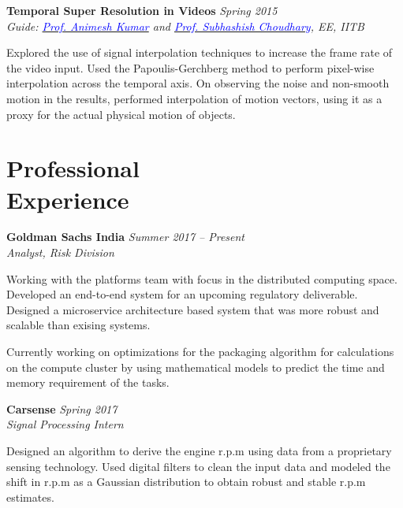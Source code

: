 \documentclass[margin,line,hidelinks]{res}
\newenvironment{list1}{
  \begin{list}{\ding{113}}{%
      \setlength{\itemsep}{0in}
      \setlength{\parsep}{0in} \setlength{\parskip}{0in}
      \setlength{\topsep}{0in} \setlength{\partopsep}{0in} 
      \setlength{\leftmargin}{0.17in}}}{\end{list}}
\begin{document}
\begin{resume}
\vspace*{-0.1in}
{\bf Temporal Super Resolution in Videos} \hfill {\it Spring 2015} \\
{\em Guide: \href{https://www.ee.iitb.ac.in/~animesh/}{\textcolor{blue}{Prof. Animesh Kumar}} and \href{https://www.ee.iitb.ac.in/~sc/}{\textcolor{blue}{Prof. Subhashish Choudhary}}, EE, IITB} \\
\vspace*{-.15in}
\begin{list1}
\item[] Explored the use of signal interpolation techniques to increase the frame rate of the video input. Used the Papoulis-Gerchberg method to perform pixel-wise interpolation across the temporal axis. On observing the noise and non-smooth motion in the results, performed interpolation of motion vectors, using it as a proxy for the actual physical motion of objects.
\end{list1}

\section{\sc Professional \\ Experience}
{\bf Goldman Sachs India} \hfill {\it Summer 2017 -- Present} \\
{\em Analyst, Risk Division} \\
\vspace*{-.15in}
\begin{list1}
\item[] Working with the platforms team with focus in the distributed computing space. Developed an end-to-end system for an upcoming regulatory deliverable. Designed a microservice architecture based system that was more robust and scalable than exising systems.
\item[] Currently working on optimizations for the packaging algorithm for calculations on the compute cluster by using mathematical models to predict the time and memory requirement of the tasks.
\end{list1}

\vspace*{-0.1in}
\pagebreak
{\bf Carsense} \hfill {\it Spring 2017 } \\
{\em Signal Processing Intern	} \\
\vspace*{-.15in}
\begin{list1}
\item[] Designed an algorithm to derive the engine r.p.m using data from a proprietary sensing technology. Used digital filters to clean the input data and modeled the shift in r.p.m as a Gaussian distribution to obtain robust and stable r.p.m estimates.
\end{list1}


\end{resume}
\end{document}
